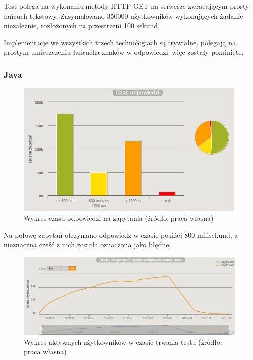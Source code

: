\documentclass[12pt,twoside]{article}
\begin{document}
Test polega na wykonaniu metody HTTP GET na serwerze zwracającym prosty
łańcuch tekstowy. Zasymulowano 350000 użytkowników wykonujących żądanie
niezależnie, rozłożonych na przestrzeni 100 sekund.

Implementacje we wszystkich trzech technologiach są trywialne, polegają
na prostym umieszczeniu łańcucha znaków w odpowiedzi, więc zostały
pominięte.

\subsubsection{Java}\label{java}

\begin{figure}[htbp]
\centering
\includegraphics[resolution=150]{test_results/java/simpletest/screenshots/response_times.png}
\caption{Wykres czasu odpowiedzi na zapytania (źródło: praca własna)}
\end{figure}

Na połowę zapytań otrzymano odpowiedź w czasie poniżej 800 milisekund, a
nieznaczna cześć z nich została oznaczona jako błędne.

\begin{figure}[htbp]
\centering
\includegraphics[resolution=150]{test_results/java/simpletest/screenshots/active_users.png}
\caption{Wykres aktywnych użytkowników w czasie trwania testu (źródło: praca własna)}
\end{figure}
\end{document}
